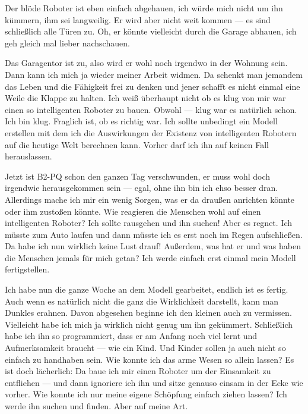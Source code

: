 Der blöde Roboter ist eben einfach abgehauen, ich würde mich nicht um ihn kümmern, ihm sei langweilig. Er wird aber nicht weit kommen — es sind schließlich alle Türen zu. Oh, er könnte vielleicht durch die Garage abhauen, ich geh gleich mal lieber nachschauen.
 
Das Garagentor ist zu, also wird er wohl noch irgendwo in der Wohnung sein. Dann kann ich mich ja wieder meiner Arbeit widmen. Da schenkt man jemandem das Leben und die Fähigkeit frei zu denken und jener schafft es nicht einmal eine Weile die Klappe zu halten. Ich weiß überhaupt nicht ob es klug von mir war einen so intelligenten Roboter zu bauen. Obwohl — klug war es natürlich schon. Ich bin klug. Fraglich ist, ob es richtig war. Ich sollte unbedingt ein Modell erstellen mit dem ich die Auswirkungen der Existenz von intelligenten Robotern auf die heutige Welt berechnen kann. Vorher darf ich ihn auf keinen Fall herauslassen.

Jetzt ist B2-PQ schon den ganzen Tag verschwunden, er muss wohl doch irgendwie herausgekommen sein — egal, ohne ihn bin ich ehso besser dran. Allerdings mache ich mir ein wenig Sorgen, was er da draußen anrichten könnte oder ihm zustoßen könnte. Wie reagieren die Menschen wohl auf einen intelligenten Roboter? Ich sollte rausgehen und ihn suchen! Aber es regnet. Ich müsste zum Auto laufen und dann müsste ich es erst noch im Regen aufschließen. Da habe ich nun wirklich keine Lust drauf! Außerdem, was hat er und was haben die Menschen jemals für mich getan? Ich werde einfach erst einmal mein Modell fertigstellen.

Ich habe nun die ganze Woche an dem Modell gearbeitet, endlich ist es fertig. Auch wenn es natürlich nicht die ganz die Wirklichkeit darstellt, kann man Dunkles erahnen. Davon abgesehen beginne ich den kleinen auch zu vermissen. Vielleicht habe ich mich ja wirklich nicht genug um ihn gekümmert. Schließlich habe ich ihn so programmiert, dass er am Anfang noch viel lernt und Aufmerksamkeit braucht — wie ein Kind. Und Kinder sollen ja auch nicht so einfach zu handhaben sein. Wie konnte ich das arme Wesen so allein lassen? Es ist doch lächerlich: Da baue ich mir einen Roboter um der Einsamkeit zu entfliehen — und dann ignoriere ich ihn und sitze genauso einsam in der Ecke wie vorher. Wie konnte ich nur meine eigene Schöpfung einfach ziehen lassen? Ich werde ihn suchen und finden. Aber auf meine Art.

